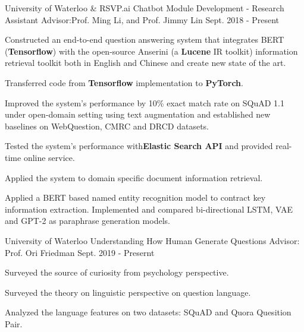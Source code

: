 

\begin{cventries}


 \cventry
    {University of Waterloo \& RSVP.ai}
    {Chatbot Module Development - Research Assistant} %
    {Advisor:Prof. Ming Li, and Prof. Jimmy Lin} %
    {Sept. 2018 - Present} %
    {
      \begin{cvitems} %
        \item {Constructed an end-to-end question answering system that integrates BERT (\textbf{Tensorflow}) with the open-source Anserini (a \textbf{Lucene} IR toolkit) information retrieval toolkit both in English and Chinese and create new state of the art.}
        \item {Transferred code from \textbf{Tensorflow} implementation to \textbf{PyTorch}.}
        \item {Improved the system's performance by 10\% exact match rate on SQuAD 1.1 under open-domain setting using text augmentation and established new baselines on WebQuestion, CMRC and DRCD datasets.}
	\item {Tested the system's performance with\textbf{Elastic Search API} and provided real-time online service.}
        \item {Applied the system to domain specific document information retrieval.}
        \item {Applied a BERT based named entity recognition model to contract key information extraction. Implemented and compared bi-directional LSTM, VAE and GPT-2 as paraphrase generation models.}
      \end{cvitems}
    }
 
   \cventry
    {University of Waterloo}
    {Understanding How Human Generate Questions } %
    {Advisor: Prof. Ori Friedman} %
    {Sept. 2019 - Presernt} %
    {
      \begin{cvitems} %
        \item {Surveyed the source of curiosity from psychology perspective.}
        \item {Surveyed the theory on linguistic perspective on question language.}
        \item {Analyzed the language features on two datasets: SQuAD and Quora Quesition Pair. }
      \end{cvitems}
    }
    

\end{cventries}
